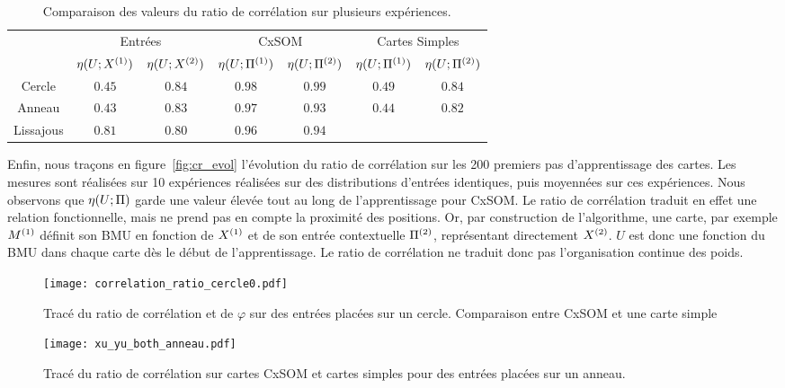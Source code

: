 \documentclass[../main]{subfiles}
\begin{document}
\begin{table}
    \centering
    \caption{Comparaison des valeurs du ratio de corrélation sur plusieurs expériences.\label{tab:eta}}
    \begin{tabular}{*7c}
        \toprule
        & \multicolumn{2}{c}{Entrées} & \multicolumn{2}{c}{CxSOM} & \multicolumn{2}{c}{Cartes Simples} \\
        \cmidrule(lr){2-7}
         & $\eta(U;X^{({1})})$ & $\eta(U;X^{({2})})$  & $\eta(U;\Pi^{({1})})$ & $\eta(U;\Pi^{({2})})$  & $\eta(U;\Pi^{({1})})$ & $\eta(U;\Pi^{({2})})$ \\    
        \midrule
        Cercle &   $0.45 $    & $0.84$  &  $0.98$ & $0.99$ & $0.49$ & $0.84$      \\
        Anneau &  $0.43$      &  $0.83$      & $0.97$ & $0.93$ & $0.44$ & $0.82$ \\
        Lissajous &  $0.81$     &  $0.80$ & $0.96$ & $0.94$  & & \\
        \bottomrule
    \end{tabular}
\end{table}

Enfin, nous traçons en figure~\ref{fig:cr_evol} l'évolution du ratio de corrélation sur les 200 premiers pas d'apprentissage des cartes. 
Les mesures sont réalisées sur 10 expériences réalisées sur des distributions d'entrées identiques, puis moyennées sur ces expériences.
Nous observons que $\eta(U;\Pi)$ garde une valeur élevée tout au long de l'apprentissage pour CxSOM.
Le ratio de corrélation traduit en effet une relation fonctionnelle, mais ne prend pas en compte la proximité des positions. 
Or, par construction de l'algorithme, une carte, par exemple $M^{({1})}$ définit son BMU en fonction de $X^{({1})}$ et de son entrée contextuelle $\Pi^{({2})}$, représentant directement $X^{({2})}$. $U$ est donc une fonction du BMU dans chaque carte dès le début de l'apprentissage. Le ratio de corrélation ne traduit donc pas l'organisation continue des poids.

\begin{figure}
    \centering\texttt{[image: correlation\_ratio\_cercle0.pdf]}
    \caption{Tracé du ratio de corrélation et de $\varphi$ sur des entrées placées sur un cercle. Comparaison entre CxSOM et une carte simple \label{fig:cr_xp}}
\end{figure}

\begin{figure}
   \centering \texttt{[image: xu\_yu\_both\_anneau.pdf]}
    \caption{Tracé du ratio de corrélation sur cartes CxSOM et cartes simples pour des entrées placées sur un anneau.\label{fig:cr_bruit}}
\end{figure}
\end{document}
